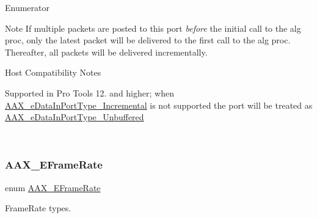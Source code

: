 \begin{DoxyEnumFields}{Enumerator}
\begin{DoxyNote}{Note}
If multiple packets are posted to this port {\itshape before} the initial call to the alg proc, only the latest packet will be delivered to the first call to the alg proc. Thereafter, all packets will be delivered incrementally.
\end{DoxyNote}
\begin{DoxyRefDesc}{Host Compatibility Notes}
\item[\mbox{\hyperlink{a00786__compatibility_notes000048}{Host Compatibility Notes}}]Supported in Pro Tools 12. and higher; when \mbox{\hyperlink{a00491_ab5677b173ad8647c24d34d28272d11fca4c356b21e878cfafca33ff61e1044b2e}{A\+A\+X\+\_\+e\+Data\+In\+Port\+Type\+\_\+\+Incremental}} is not supported the port will be treated as \mbox{\hyperlink{a00491_ab5677b173ad8647c24d34d28272d11fca43dc59a68b369ee607f70700bfd02c2d}{A\+A\+X\+\_\+e\+Data\+In\+Port\+Type\+\_\+\+Unbuffered}} \end{DoxyRefDesc}
\\
\hline

\end{DoxyEnumFields}
\mbox{\label{a00491_a1271a51553bf508de59864334111aa8f}} 
\subsubsection{\texorpdfstring{AAX\_EFrameRate}{AAX\_EFrameRate}}
{\footnotesize\ttfamily enum \mbox{\hyperlink{a00491_a1271a51553bf508de59864334111aa8f}{A\+A\+X\+\_\+\+E\+Frame\+Rate}}}



Frame\+Rate types. 

